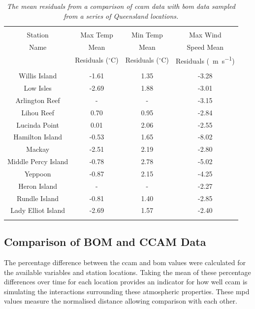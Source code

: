 \begin{table}[tbh!]
	\caption{\textsl{ The mean residuals from a comparison of \gls{ccam} data with \gls{bom} data sampled from a series of Queensland locations. }}
	\centering
		\begin{tabular}{c c c c} \\
			\hline 	\\ 	[-1ex]
			Station				&	Max Temp	&	Min Temp	&	Max Wind 	\\	
			Name 				&	Mean 	&	Mean 	&	Speed Mean 	\\
								&	Residuals ($^{\circ}$C)	&	Residuals ($^{\circ}$C)	&	Residuals (\SI[per-mode=symbol]{}{\meter\per\second})	\\ [1ex]
			\hline	\\	[-1ex]		
			Willis Island		&	-1.61		&	1.35		&	-3.28		\\	
			Low Isles			&	-2.69		&	1.88		&	-3.01		\\	
			Arlington Reef		&	-			&	-			&	-3.15		\\	
			Lihou Reef			&	0.70		&	0.95		&	-2.84		\\	
			Lucinda Point		&	0.01		&	2.06		&	-2.55		\\	
			Hamilton Island		&	-0.53		&	1.65		&	-8.02		\\	
			Mackay				&	-2.51		&	2.19		&	-2.80		\\	
			Middle Percy Island	&	-0.78		&	2.78		&	-5.02		\\	
			Yeppoon				&	-0.87		&	2.15		&	-4.25		\\	
			Heron Island		&	-			&	-			&	-2.27		\\	
			Rundle Island		&	-0.81		&	1.40		&	-2.85		\\	
			Lady Elliot Island	&	-2.69		&	1.57		&	-2.40		\\	[1ex]
			\hline \\
		\end{tabular}
	\label{tab:bommeanres}
\end{table}

\subsection{Comparison of BOM and CCAM Data}
\label{subsec:compplots}

The percentage difference between the \gls{ccam} and \gls{bom} values were calculated for the available variables and station locations. Taking the mean of these percentage differences over time for each location provides an indicator for how well \gls{ccam} is simulating the interactions surrounding these atmospheric properties. These \gls{mpd} values measure the normalised distance allowing comparison with each other.

